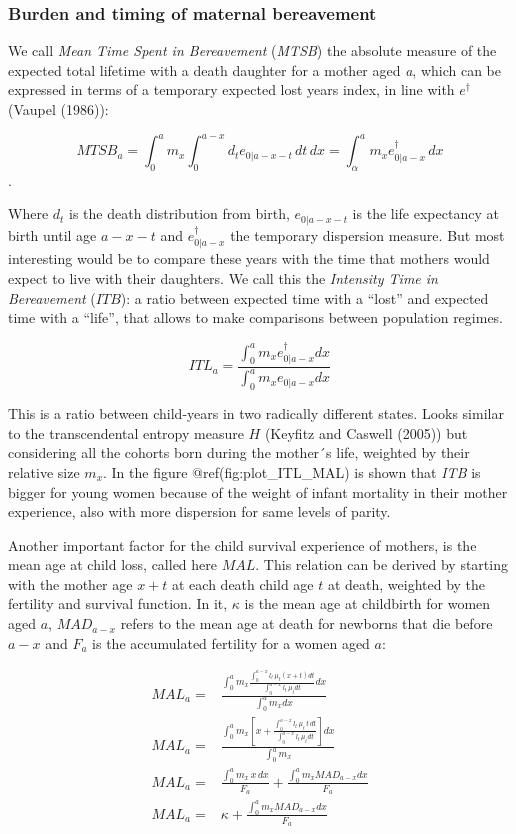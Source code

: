 \documentclass[
]{article}
\begin{document}
\hypertarget{burden-and-timing-of-maternal-bereavement}{%
\subsubsection{Burden and timing of maternal
bereavement}\label{burden-and-timing-of-maternal-bereavement}}

We call \emph{Mean Time Spent in Bereavement} (\emph{MTSB}) the absolute
measure of the expected total lifetime with a death daughter for a
mother aged \emph{a}, which can be expressed in terms of a temporary
expected lost years index, in line with \(e^\dagger\) (Vaupel (1986)):

\[MTSB_a = \int_0^a{m_x\int_0^{a-x}{d_t e_{0|a-x-t}\, dt}\,dx} = \int_\alpha^a{m_x e_{0|a-x}^\dagger \,dx}\].

Where \(d_t\) is the death distribution from birth, \(e_{0|a-x-t}\) is
the life expectancy at birth until age \(a-x-t\) and
\(e_{0|a-x}^\dagger\) the temporary dispersion measure. But most
interesting would be to compare these years with the time that mothers
would expect to live with their daughters. We call this the
\emph{Intensity Time in Bereavement} (\(ITB\)): a ratio between expected
time with a ``lost'' and expected time with a ``life'', that allows to
make comparisons between population regimes.

\[ITL_a = \frac{\int_0^a{m_x e_{0|{a-x}}^\dagger dx}}{\int_0^a{m_x e_{0|a-x} dx}}\]

This is a ratio between child-years in two radically different states.
Looks similar to the transcendental entropy measure \(H\) (Keyfitz and
Caswell (2005)) but considering all the cohorts born during the mother´s
life, weighted by their relative size \(m_x\). In the figure
@ref(fig:plot\_ITL\_MAL) is shown that \emph{ITB} is bigger for young
women because of the weight of infant mortality in their mother
experience, also with more dispersion for same levels of parity.

Another important factor for the child survival experience of mothers,
is the mean age at child loss, called here \(MAL\). This relation can be
derived by starting with the mother age \(x+t\) at each death child age
\(t\) at death, weighted by the fertility and survival function. In it,
\(\kappa\) is the mean age at childbirth for women aged \(a\),
\(MAD_{a-x}\) refers to the mean age at death for newborns that die
before \(a-x\) and \(F_a\) is the accumulated fertility for a women aged
\(a\):

\[
\begin{aligned}
MAL_a = & \frac{\int_0^a{m_x {\frac{\int_0^{a-x} l_t \, \mu_t (x+t) dt}{\int_0^{a-x} l_t \, \mu_t dt}}dx}}{\int_0^a{m_x}dx} \\
  MAL_a = & \frac{\int_0^a{m_x \left[{x+\frac{\int_0^{a-x} l_t \, \mu_t \, t \, dt}{\int_0^{a-x} l_t \, \mu_t dt}}\right]dx}}{\int_0^a{m_x}} \\
  MAL_a = & \frac{\int_0^a{m_x \,x \,dx}}{F_a} + \frac{\int_0^a{m_x MAD_{a-x}dx}}{F_a} \\
  MAL_a = & \kappa + \frac{\int_0^a{m_x MAD_{a-x}dx}}{F_a}
\end{aligned}
\]
\end{document}
